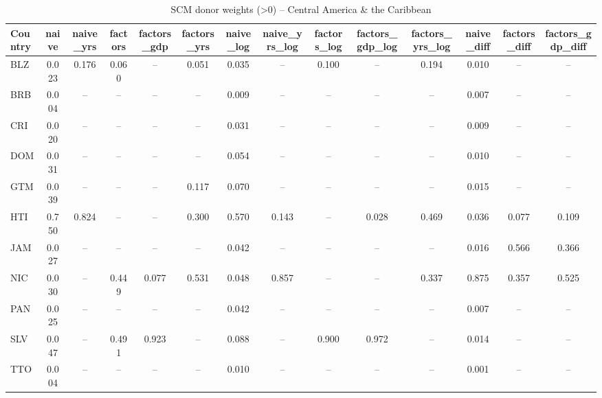 \begin{longtable}{l*{13}{c}}
\caption{SCM donor weights (>0) -- Central America \& the Caribbean}\label{tab:weights-central_caribbean}\\
\toprule
Country & naive & naive\_yrs & factors & factors\_gdp & factors\_yrs & naive\_log & naive\_yrs\_log & factors\_log & factors\_gdp\_log & factors\_yrs\_log & naive\_diff & factors\_diff & factors\_gdp\_diff \\
\midrule
BLZ & 0.023 & 0.176 & 0.060 & -- & 0.051 & 0.035 & -- & 0.100 & -- & 0.194 & 0.010 & -- & -- \\
BRB & 0.004 & -- & -- & -- & -- & 0.009 & -- & -- & -- & -- & 0.007 & -- & -- \\
CRI & 0.020 & -- & -- & -- & -- & 0.031 & -- & -- & -- & -- & 0.009 & -- & -- \\
DOM & 0.031 & -- & -- & -- & -- & 0.054 & -- & -- & -- & -- & 0.010 & -- & -- \\
GTM & 0.039 & -- & -- & -- & 0.117 & 0.070 & -- & -- & -- & -- & 0.015 & -- & -- \\
HTI & 0.750 & 0.824 & -- & -- & 0.300 & 0.570 & 0.143 & -- & 0.028 & 0.469 & 0.036 & 0.077 & 0.109 \\
JAM & 0.027 & -- & -- & -- & -- & 0.042 & -- & -- & -- & -- & 0.016 & 0.566 & 0.366 \\
NIC & 0.030 & -- & 0.449 & 0.077 & 0.531 & 0.048 & 0.857 & -- & -- & 0.337 & 0.875 & 0.357 & 0.525 \\
PAN & 0.025 & -- & -- & -- & -- & 0.042 & -- & -- & -- & -- & 0.007 & -- & -- \\
SLV & 0.047 & -- & 0.491 & 0.923 & -- & 0.088 & -- & 0.900 & 0.972 & -- & 0.014 & -- & -- \\
TTO & 0.004 & -- & -- & -- & -- & 0.010 & -- & -- & -- & -- & 0.001 & -- & -- \\
\bottomrule
\end{longtable}
